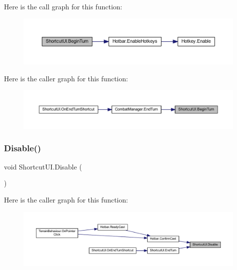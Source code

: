 Here is the call graph for this function\+:\nopagebreak
\begin{figure}[H]
\begin{center}
\leavevmode
\includegraphics[width=350pt]{class_shortcut_u_i_af20cdb51997f4ae7219a36a7bca851a3_cgraph}
\end{center}
\end{figure}
Here is the caller graph for this function\+:\nopagebreak
\begin{figure}[H]
\begin{center}
\leavevmode
\includegraphics[width=350pt]{class_shortcut_u_i_af20cdb51997f4ae7219a36a7bca851a3_icgraph}
\end{center}
\end{figure}
\mbox{\label{class_shortcut_u_i_a00f6fd2d64d2e5e978b749eafbe8f949}} 
\subsubsection{\texorpdfstring{Disable()}{Disable()}}
{\footnotesize\ttfamily void Shortcut\+U\+I.\+Disable (\begin{DoxyParamCaption}{ }\end{DoxyParamCaption})}

Here is the caller graph for this function\+:\nopagebreak
\begin{figure}[H]
\begin{center}
\leavevmode
\includegraphics[width=350pt]{class_shortcut_u_i_a00f6fd2d64d2e5e978b749eafbe8f949_icgraph}
\end{center}
\end{figure}
\mbox{\label{class_shortcut_u_i_ae39ab7b830aff78693a4ddbaa3c59c3e}} 

